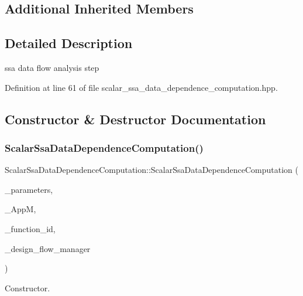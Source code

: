 \subsection*{Additional Inherited Members}


\subsection{Detailed Description}
ssa data flow analysis step 

Definition at line 61 of file scalar\+\_\+ssa\+\_\+data\+\_\+dependence\+\_\+computation.\+hpp.



\subsection{Constructor \& Destructor Documentation}
\mbox{\label{classScalarSsaDataDependenceComputation_a8f3ca68496e20e4a19dfebc7bc2cadfb}} 
\subsubsection{\texorpdfstring{Scalar\+Ssa\+Data\+Dependence\+Computation()}{ScalarSsaDataDependenceComputation()}}
{\footnotesize\ttfamily Scalar\+Ssa\+Data\+Dependence\+Computation\+::\+Scalar\+Ssa\+Data\+Dependence\+Computation (\begin{DoxyParamCaption}\item[{const \hyperlink{Parameter_8hpp_a37841774a6fcb479b597fdf8955eb4ea}{Parameter\+Const\+Ref}}]{\+\_\+parameters,  }\item[{const \hyperlink{application__manager_8hpp_a04ccad4e5ee401e8934306672082c180}{application\+\_\+manager\+Ref}}]{\+\_\+\+AppM,  }\item[{unsigned int}]{\+\_\+function\+\_\+id,  }\item[{const Design\+Flow\+Manager\+Const\+Ref}]{\+\_\+design\+\_\+flow\+\_\+manager }\end{DoxyParamCaption})}



Constructor. 

